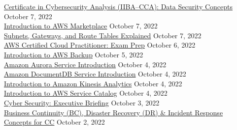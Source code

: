 \documentclass[10pt]{res} %
\begin{document}
\begin{resume}
\href{https://bjdelacruz.dev/files/certificates/pluralsight/5_Certificate_in_Cybersecurity_Analysis_IIBA_CCA_Data_Security_Concepts.pdf}{\color{blue}Certificate in Cybersecurity Analysis (IIBA\textsuperscript{\textregistered}--CCA): Data Security Concepts} \hfill October 7, 2022 \\
\href{https://bjdelacruz.dev/files/certificates/pluralsight/Introduction_to_AWS_Marketplace.pdf}{\color{blue}Introduction to AWS Marketplace} \hfill October 7, 2022 \\
\href{https://bjdelacruz.dev/files/certificates/pluralsight/Subnets_Gateways_and_Route_Tables_Explained.pdf}{\color{blue}Subnets, Gateways, and Route Tables Explained} \hfill October 7, 2022 \\
\href{https://bjdelacruz.dev/files/certificates/pluralsight/4_AWS_Certified_Cloud_Practitioner_Exam_Prep.pdf}{\color{blue}AWS Certified Cloud Practitioner: Exam Prep} \hfill October 6, 2022 \\
\href{https://bjdelacruz.dev/files/certificates/pluralsight/Introduction_to_AWS_Backup.pdf}{\color{blue}Introduction to AWS Backup} \hfill October 5, 2022 \\
\href{https://bjdelacruz.dev/files/certificates/pluralsight/Amazon_Aurora_Service_Introduction.pdf}{\color{blue}Amazon Aurora Service Introduction} \hfill October 4, 2022 \\
\href{https://bjdelacruz.dev/files/certificates/pluralsight/Amazon_DocumentDB_Service_Introduction.pdf}{\color{blue}Amazon DocumentDB Service Introduction} \hfill October 4, 2022 \\
\href{https://bjdelacruz.dev/files/certificates/pluralsight/Introduction_to_Amazon_Kinesis_Analytics.pdf}{\color{blue}Introduction to Amazon Kinesis Analytics} \hfill October 4, 2022 \\
\href{https://bjdelacruz.dev/files/certificates/pluralsight/Introduction_to_AWS_Service_Catalog.pdf}{\color{blue}Introduction to AWS Service Catalog} \hfill October 4, 2022 \\
\href{https://bjdelacruz.dev/files/certificates/pluralsight/2_Cyber_Security_Executive_Briefing.pdf}{\color{blue}Cyber Security: Executive Briefing} \hfill October 3, 2022 \\
\href{https://bjdelacruz.dev/files/certificates/pluralsight/2_Business_Continuity_BC_Disaster_Recovery_DR_Incident_Response_Concepts_for_CC.pdf}{\color{blue}Business Continuity (BC), Disaster Recovery (DR) \& Incident Response Concepts for CC\textservicemark} \hfill October 2, 2022 \\

\end{resume}
\end{document}
